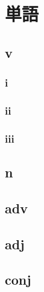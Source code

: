 \chapter{単語}
\newpage

\section{v}

\newpage

\subsection{i}

\newpage

\subsection{ii}

\newpage

\subsection{iii}

\newpage

\section{n}

\newpage

\section{adv}

\newpage

\section{adj}

\newpage

\section{conj}

\newpage

\newpage